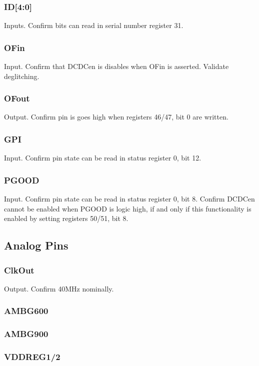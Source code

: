 \documentclass[11pt]{article}   			%
\begin{document}
\subsubsection{ID[4:0]}
Inputs. Confirm bits can read in serial number register 31.

\subsubsection{OFin}
Input. Confirm that DCDCen is disables when OFin is asserted. Validate deglitching.

\subsubsection{OFout}
Output. Confirm pin is goes high when registers 46/47, bit 0 are written.

\subsubsection{GPI}
Input. Confirm pin state can be read in status register 0, bit 12.

\subsubsection{PGOOD}
Input. Confirm pin state can be read in status register 0, bit 8. Confirm DCDCen cannot be enabled when 
PGOOD is logic high, if and only if this functionality is enabled by setting registers 50/51, bit 8.

\subsection{Analog Pins}

\subsubsection{ClkOut}
Output. Confirm 40MHz nominally.

\subsubsection{AMBG600}

\subsubsection{AMBG900}

\subsubsection{VDDREG1/2}
\end{document}
